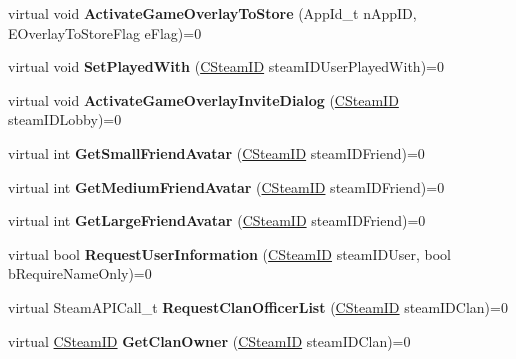 \begin{DoxyCompactItemize}
virtual void {\bfseries Activate\+Game\+Overlay\+To\+Store} (App\+Id\+\_\+t n\+App\+ID, E\+Overlay\+To\+Store\+Flag e\+Flag)=0
\item 
\mbox{\label{class_i_steam_friends_a9a1585d9277f80b9dd22f268b2b16f73}} 
virtual void {\bfseries Set\+Played\+With} (\hyperlink{class_c_steam_i_d}{C\+Steam\+ID} steam\+I\+D\+User\+Played\+With)=0
\item 
\mbox{\label{class_i_steam_friends_acabecb72f25302d9909519788d193f13}} 
virtual void {\bfseries Activate\+Game\+Overlay\+Invite\+Dialog} (\hyperlink{class_c_steam_i_d}{C\+Steam\+ID} steam\+I\+D\+Lobby)=0
\item 
\mbox{\label{class_i_steam_friends_afa940165783547227f489fea9b0623cf}} 
virtual int {\bfseries Get\+Small\+Friend\+Avatar} (\hyperlink{class_c_steam_i_d}{C\+Steam\+ID} steam\+I\+D\+Friend)=0
\item 
\mbox{\label{class_i_steam_friends_a16c65f939af9f28ff82e4920bf08b85b}} 
virtual int {\bfseries Get\+Medium\+Friend\+Avatar} (\hyperlink{class_c_steam_i_d}{C\+Steam\+ID} steam\+I\+D\+Friend)=0
\item 
\mbox{\label{class_i_steam_friends_a63fc9433e7db6607e576a2337a92a35d}} 
virtual int {\bfseries Get\+Large\+Friend\+Avatar} (\hyperlink{class_c_steam_i_d}{C\+Steam\+ID} steam\+I\+D\+Friend)=0
\item 
\mbox{\label{class_i_steam_friends_a7361d0c70a8f3bfafef904f031ab2672}} 
virtual bool {\bfseries Request\+User\+Information} (\hyperlink{class_c_steam_i_d}{C\+Steam\+ID} steam\+I\+D\+User, bool b\+Require\+Name\+Only)=0
\item 
\mbox{\label{class_i_steam_friends_a86559d74486ea2615531b17ae0fed9d3}} 
virtual Steam\+A\+P\+I\+Call\+\_\+t {\bfseries Request\+Clan\+Officer\+List} (\hyperlink{class_c_steam_i_d}{C\+Steam\+ID} steam\+I\+D\+Clan)=0
\item 
\mbox{\label{class_i_steam_friends_aa7dc090b7d3f5fe7091c0768df42e08a}} 
virtual \hyperlink{class_c_steam_i_d}{C\+Steam\+ID} {\bfseries Get\+Clan\+Owner} (\hyperlink{class_c_steam_i_d}{C\+Steam\+ID} steam\+I\+D\+Clan)=0

\end{DoxyCompactItemize}
